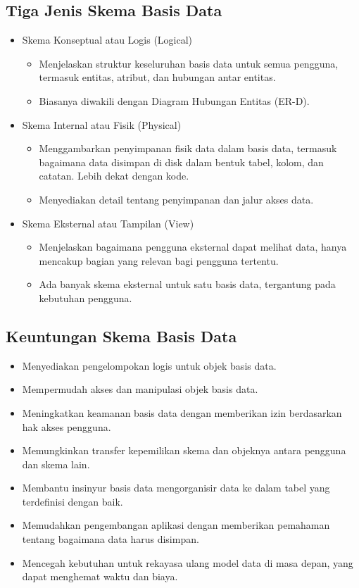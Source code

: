 \documentclass{article}
\begin{document}
\subsection{Tiga Jenis Skema Basis Data}
\begin{itemize}
    \item Skema Konseptual atau Logis (Logical)
          \begin{itemize}
              \item Menjelaskan struktur keseluruhan basis data untuk semua pengguna, termasuk entitas, atribut, dan hubungan antar entitas.
              \item Biasanya diwakili dengan Diagram Hubungan Entitas (ER-D).
          \end{itemize}
    \item Skema Internal atau Fisik (Physical)
          \begin{itemize}
              \item Menggambarkan penyimpanan fisik data dalam basis data, termasuk bagaimana data disimpan di disk dalam bentuk tabel, kolom, dan catatan. Lebih dekat dengan kode.
              \item Menyediakan detail tentang penyimpanan dan jalur akses data.
          \end{itemize}
    \item Skema Eksternal atau Tampilan (View)
          \begin{itemize}
              \item Menjelaskan bagaimana pengguna eksternal dapat melihat data, hanya mencakup bagian yang relevan bagi pengguna tertentu.
              \item Ada banyak skema eksternal untuk satu basis data, tergantung pada kebutuhan pengguna.
          \end{itemize}
\end{itemize}

\subsection{Keuntungan Skema Basis Data}
\begin{itemize}
    \item Menyediakan pengelompokan logis untuk objek basis data.
    \item Mempermudah akses dan manipulasi objek basis data.
    \item Meningkatkan keamanan basis data dengan memberikan izin berdasarkan hak akses pengguna.
    \item Memungkinkan transfer kepemilikan skema dan objeknya antara pengguna dan skema lain.
    \item Membantu insinyur basis data mengorganisir data ke dalam tabel yang terdefinisi dengan baik.
    \item Memudahkan pengembangan aplikasi dengan memberikan pemahaman tentang bagaimana data harus disimpan.
    \item Mencegah kebutuhan untuk rekayasa ulang model data di masa depan, yang dapat menghemat waktu dan biaya.
\end{itemize}
\end{document}
